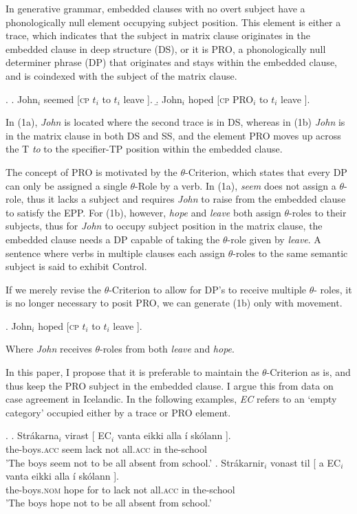 \documentclass[a4paper, 11pt]{article}
\begin{document}
\begin{enumerate}[label=\textbf{\arabic*.}]
  In generative grammar, embedded clauses with no overt subject have a phonologically null
  element occupying subject position. This element is either a trace, which indicates that
  the subject in matrix clause originates in the embedded clause in deep structure (DS), or
  it is PRO, a phonologically null determiner phrase (DP) that originates and stays within the
  embedded clause, and is coindexed with the subject of the matrix clause.

  \ex.
    \a. John$_{i}$ seemed [\textsc{cp} $t_{i}$ to $t_{i}$ leave ].
    \b. John$_{i}$ hoped [\textsc{cp} PRO$_{i}$ to $t_{i}$ leave ].

  In (1a), \emph{John} is located where the second trace is in DS, whereas in (1b) \emph{John}
  is in the matrix clause in both DS and SS, and the element PRO moves up across the T \emph{to}
  to the specifier-TP position within the embedded clause.

  The concept of PRO is motivated by the $\theta$-Criterion, which states that every DP can only
  be assigned a single $\theta$-Role by a verb. In (1a), \emph{seem} does not assign a $\theta$-
  role, thus it lacks a subject and requires \emph{John} to raise from the embedded clause to 
  satisfy the EPP.
  For (1b), however, \emph{hope} and \emph{leave} both assign $\theta$-roles to their
  subjects, thus for \emph{John} to occupy subject position in the matrix clause, the embedded
  clause needs a DP capable of taking the $\theta$-role given by \emph{leave}. A sentence where
  verbs in multiple clauses each assign $\theta$-roles to the same semantic subject is said to
  exhibit Control.
  
  If we merely revise the $\theta$-Criterion to allow for DP's to receive multiple $\theta$-
  roles, it is no longer necessary to posit PRO, we can generate (1b) only with movement.

  \ex. John$_{i}$ hoped [\textsc{cp} $t_{i}$ to $t_{i}$ leave ].

  Where \emph{John} receives $\theta$-roles from both \emph{leave} and \emph{hope}.

  In this paper, I propose that it is preferable to maintain the $\theta$-Criterion as is,
  and thus keep the PRO subject in the embedded clause. I argue this from data on case
  agreement in Icelandic. In the following examples, \emph{EC} refers to an `empty category'
  occupied either by a trace or PRO element.

  \ex.
    \ag. Strákarna$_{i}$ virast 
    [ EC$_{i}$  vanta eikki alla í skólann ].\\
    the-boys\textsc{.acc} seem {} {} lack not all\textsc{.acc} in the-school\\
    \trans 'The boys seem not to be all absent from school.'
    \bg. Strákarnir$_{i}$ vonast til
    [ a EC$_{i}$  vanta eikki alla í skólann ].\\
    the-boys\textsc{.nom} hope for {} to {} lack not all\textsc{.acc} in the-school\\
    \trans 'The boys hope not to be all absent from school.'


\end{enumerate}
\end{document}

